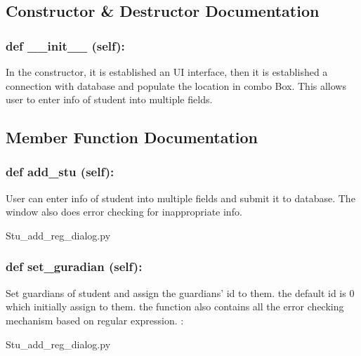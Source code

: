 \subsection{Constructor \& Destructor Documentation}
\hypertarget{class_poly_aa3def076b74bed67904976ad4f9fe9b1}{
\subsubsection[{def __init__ (self):}]{\setlength{\rightskip}{0pt plus 5cm}def {\_\_init\_\_} (self): 
}}
In the constructor, it is established an UI interface, then it is  established a connection with database and populate the location in combo Box. This allows user to enter info of student into multiple fields. 
 

\subsection{Member Function Documentation}
\hypertarget{class_poly_a14a7ad77ce612b0c54f531d307ee4b39}{
\subsubsection[{def add_stu (self):}]{\setlength{\rightskip}{0pt plus 5cm}def {add\_stu} (self):}}\label{class_poly_a14a7ad77ce612b0c54f531d307ee4b39}
User can enter info of student into multiple fields and submit it to database. The window also does error checking for inappropriate info. 
\begin{DoxyCompactItemize}
\item 
Stu\_add\_reg\_dialog.\-py\end{DoxyCompactItemize}

\hypertarget{class_poly_a14a7ad77ce612b0c54f531d307ee4b39}{
\subsubsection[{def set_guradian (self):}]{\setlength{\rightskip}{0pt plus 5cm}def {set\_guradian} (self):}}\label{class_poly_a14a7ad77ce612b0c54f531d307ee4b39}
Set guardians of student and assign the guardians' id to them. the default id is 0 which initially assign to them. the function also contains all the error checking mechanism based on regular expression.
:\begin{DoxyCompactItemize}
\item 
Stu\_add\_reg\_dialog.\-py\end{DoxyCompactItemize}

